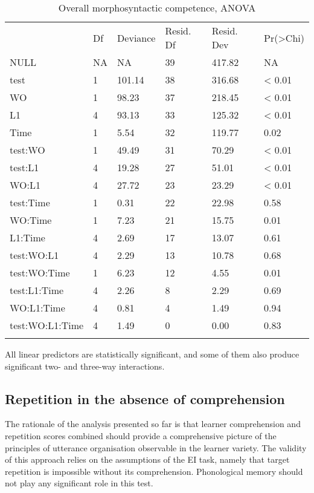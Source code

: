 \begin{table}
    \begin{tabularx}{\textwidth}{XXXXXX}
         & Df & Deviance & Resid. Df & Resid. Dev & Pr(>Chi)\\
        \lsptoprule
        NULL & NA & NA & 39 & 417.82 & NA\\
        test & 1 & 101.14 & 38 & 316.68 & < 0.01\\
        WO & 1 & 98.23 & 37 & 218.45 & < 0.01\\
        L1 & 4 & 93.13 & 33 & 125.32 & < 0.01\\
        Time & 1 & 5.54 & 32 & 119.77 & 0.02\\
        test:WO & 1 & 49.49 & 31 & 70.29 & < 0.01\\
        test:L1 & 4 & 19.28 & 27 & 51.01 & < 0.01\\
        WO:L1 & 4 & 27.72 & 23 & 23.29 & < 0.01\\
        test:Time & 1 & 0.31 & 22 & 22.98 & 0.58\\
        WO:Time & 1 & 7.23 & 21 & 15.75 & 0.01\\
        L1:Time & 4 & 2.69 & 17 & 13.07 & 0.61\\
        test:WO:L1 & 4 & 2.29 & 13 & 10.78 & 0.68\\
        test:WO:Time & 1 & 6.23 & 12 & 4.55 & 0.01\\
        test:L1:Time & 4 & 2.26 & 8 & 2.29 & 0.69\\
        WO:L1:Time & 4 & 0.81 & 4 & 1.49 & 0.94\\
        test:WO:L1:Time & 4 & 1.49 & 0 & 0.00 & 0.83\\
        \lspbottomrule
    \end{tabularx}
    \caption{Overall morphosyntactic competence, ANOVA}
    \label{tab:06:7}
\end{table}

All linear predictors are statistically significant, and some of them also produce significant two- and three-way interactions. 

\subsection{Repetition in the absence of comprehension}\label{sec:06:3.3}

The rationale of the analysis presented so far is that learner comprehension and repetition scores combined should provide a comprehensive picture of the principles of utterance organisation observable in the learner variety. The validity of this approach relies on the assumptions of the EI task, namely that target repetition is impossible without its comprehension. Phonological memory should not play any significant role in this test. 

